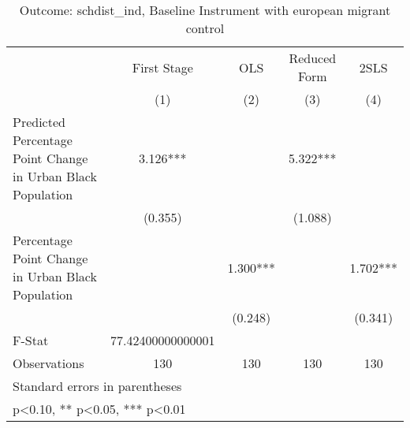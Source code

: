 \begin{table}[htbp]\centering
\def\sym#1{\ifmmode^{#1}\else\(^{#1}\)\fi}
\caption{Outcome: schdist\_ind, Baseline Instrument with european migrant control}
\begin{tabular}{l*{4}{c}}
\toprule
                    & First Stage   &         OLS   &Reduced Form   &        2SLS   \\
                    &\multicolumn{1}{c}{(1)}   &\multicolumn{1}{c}{(2)}   &\multicolumn{1}{c}{(3)}   &\multicolumn{1}{c}{(4)}   \\
\midrule
Predicted Percentage Point Change in Urban Black Population&       3.126***&               &       5.322***&               \\
                    &     (0.355)   &               &     (1.088)   &               \\
\addlinespace
Percentage Point Change in Urban Black Population&               &       1.300***&               &       1.702***\\
                    &               &     (0.248)   &               &     (0.341)   \\
\midrule
F-Stat              &77.42400000000001   &               &               &               \\
Observations        &         130   &         130   &         130   &         130   \\
\bottomrule
\multicolumn{5}{l}{\footnotesize Standard errors in parentheses}\\
\multicolumn{5}{l}{\footnotesize * p<0.10, ** p<0.05, *** p<0.01}\\
\end{tabular}
\end{table}
